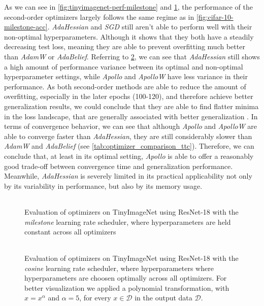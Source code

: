 As we can see in \ref{fig:tinyimagenet-perf-milestone} and \ref{fig:tinyimagenet-perf-cosine}, the performance of the second-order optimizers 
largely follows the same regime as in \ref{fig:cifar-10-milestone-acc}. \emph{AdaHessian} and \emph{SGD} still aren't able to perform 
well with their non-optimal hyperparameters. Although it shows that they both have a steadily decreasing test loss, 
meaning they are able to prevent overfitting much better than \emph{AdamW} or \emph{AdaBelief}. 
Referring to \ref{fig:tinyimagenet-perf-opt}, we can see that \emph{AdaHessian} still shows a high amount of performance variance 
between its optimal and non-optimal hyperparameter settings, while \emph{Apollo} and \emph{ApolloW} have less variance in their performance. 
As both second-order methods are able to reduce the amount of overfitting, especially in the later epochs (100-120), and therefore 
achieve better generalization results, we could conclude that they are able to find flatter minima in the loss landscape, that
are generally associated with better generalization \cite{Goodfellow-et-al-2016}.
In terms of convergence behavior, we can see that although \emph{Apollo} and \emph{ApolloW} are able
to converge faster than \emph{AdaHessian}, they are still considerably slower than \emph{AdamW} and \emph{AdaBelief} (see \ref{tab:optimizer_comparison_ttc}). 
Therefore, we can conclude that, at least in its optimal setting, \emph{Apollo} is able to offer a reasonably good 
trade-off between convergence time and generalization performance. Meanwhile, \emph{AdaHessian} is severely limited in its practical 
applicability not only by its variability in performance, but also by its memory usage.

\begin{figure}[h!]
    \centering
    \begin{tabular}{cc}
         \\ 
    \end{tabular}
    \caption{Evaluation of optimizers on TinyImageNet using ResNet-18 with the \emph{milestone} learning rate scheduler, where hyperparameters
    are held constant across all optimizers}
    \label{fig:tinyimagenet-perf-cosine}
\end{figure}
\begin{figure}[h!]
    \centering
    \begin{tabular}{cc}
         \\ 
    \end{tabular}
    \caption{Evaluation of optimizers on TinyImageNet using ResNet-18 with the \emph{cosine} learning rate scheduler, where hyperparameters
    where hyperparameters are choosen optimally across all optimizers. For better visualization we applied a polynomial transformation, with $\hat{x}=x^\alpha$ and $\alpha=5$, for every $x \in \mathcal{D}$ in the output data $ \mathcal{D}$.}
    \label{fig:tinyimagenet-perf-opt}
\end{figure}

